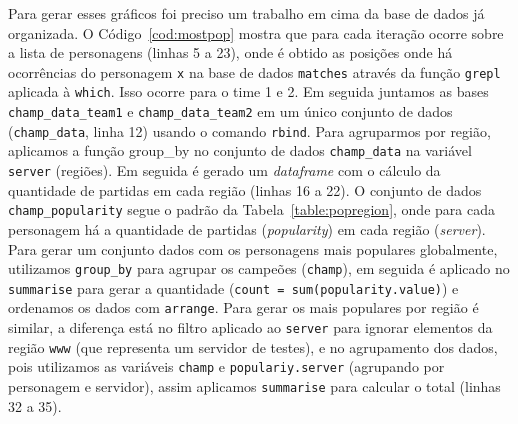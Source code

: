 \documentclass[a4paper]{article}
\begin{document}
Para gerar esses gráficos foi preciso um trabalho em cima da base de dados já organizada. O Código~\ref{cod:mostpop} mostra que para cada iteração ocorre sobre a lista de personagens (linhas 5 a 23), onde é obtido as posições onde há ocorrências do personagem \texttt{x} na base de dados \texttt{matches} através da função \texttt{grepl} aplicada à \texttt{which}. Isso ocorre para o time 1 e 2. Em seguida juntamos as bases \texttt{champ\_data\_team1} e \texttt{champ\_data\_team2} em um único conjunto de dados (\texttt{champ\_data}, linha 12) usando o comando \texttt{rbind}. Para agruparmos por região, aplicamos a função group\_by no conjunto de dados \texttt{champ\_data} na variável \texttt{server} (regiões). Em seguida é gerado um \textit{dataframe} com o cálculo da quantidade de partidas em cada região (linhas 16 a 22). O conjunto de dados \texttt{champ\_popularity} segue o padrão da Tabela~\ref{table:popregion}, onde para cada personagem há a quantidade de partidas (\textit{popularity}) em cada região (\textit{server}). Para gerar um conjunto dados com os personagens mais populares globalmente, utilizamos \texttt{group\_by} para agrupar os campeões (\texttt{champ}), em seguida é aplicado no \texttt{summarise} para gerar a quantidade (\texttt{count = sum(popularity.value)}) e ordenamos os dados com \texttt{arrange}. Para gerar os mais populares por região é similar, a diferença está no filtro aplicado ao \texttt{server} para ignorar elementos da região \texttt{www} (que representa um servidor de testes), e no agrupamento dos dados, pois utilizamos as variáveis \texttt{champ} e \texttt{populariy.server} (agrupando por personagem e servidor), assim aplicamos \texttt{summarise} para calcular o total (linhas 32 a 35).
\end{document}
